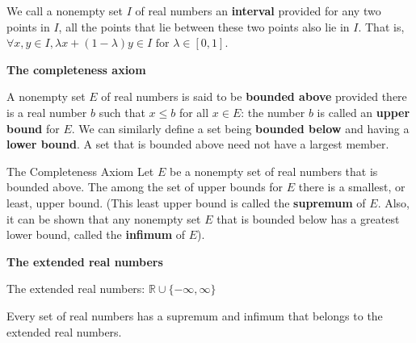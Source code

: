 \begin{flushleft}
We call a nonempty set $I$ of real numbers an \textbf{interval} provided for any two points in $I$, all the points that lie between these two points also lie in $I$.
That is, $\forall x,y \in I, \lambda x + (1-\lambda)y \in I \text{ for } \lambda \in [0,1]$.
\medskip

\textbf{The completeness axiom}\par
A nonempty set $E$ of real numbers is said to be \textbf{bounded above} provided there is a real number $b$ such that $x \le b$ for all $x\in E$: the number $b$ is called an \textbf{upper bound} for $E$.
We can similarly define a set being \textbf{bounded below} and having a \textbf{lower bound}. A set that is bounded above need not have a largest member.
\begin{namedthm*}{The Completeness Axiom}
Let $E$ be a nonempty set of real numbers that is bounded above. The among the set of upper bounds for $E$ there is a smallest, or least, upper bound.
(This least upper bound is called the \textbf{supremum} of $E$. Also, it can be shown that any nonempty set $E$ that is bounded below has a greatest lower bound, called the \textbf{infimum} of $E$).	
\end{namedthm*}

\medskip
\textbf{The extended real numbers}\par
The extended real numbers: $\mathbb{R} \cup \{-\infty,\infty\}$\par
Every set of real numbers has a supremum and infimum that belongs to the extended real numbers.

\end{flushleft}

